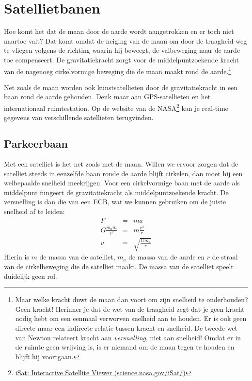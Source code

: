 \documentclass{ximera}
\begin{document}
	\author{Bart Lambregs}
    \xmsource


	\section{Satellietbanen}

	Hoe komt het dat de maan door de aarde wordt aangetrokken en er toch niet naartoe valt? Dat komt omdat de neiging van de maan om door de traagheid weg te vliegen volgens de richting waarin hij beweegt, de valbeweging naar de aarde toe compenseert. De gravitatiekracht zorgt voor de middelpuntzoekende kracht van de nagenoeg cirkelvormige beweging die de maan maakt rond de aarde.\footnote{Maar welke kracht duwt de maan dan voort om zijn snelheid te onderhouden? Geen kracht! Herinner je dat de wet van de traagheid zegt dat je geen kracht nodig hebt om een eenmaal verworven snelheid aan te houden. Er is ook geen directe maar een indirecte relatie tussen kracht en snelheid. De tweede wet van Newton relateert kracht aan \textit{versnelling}, niet aan snelheid! Omdat er in de ruimte geen wrijving is, is er niemand om de maan tegen te houden en blijft hij voortgaan.}
	
	Net zoals de maan worden ook kunstsatellieten door de gravitatiekracht in een baan rond de aarde gehouden. Denk maar aan GPS-satellieten en het internationaal ruimtestation. Op de website van de NASA\footnote{\href{http://science.nasa.gov/iSat/}{iSat: Interactive Satellite Viewer (science.nasa.gov/iSat/)}} kan je real-time gegevens van verschillende satellieten terugvinden.
	
	\subsection{Parkeerbaan}
	
	Met een satelliet is het net zoals met de maan. Willen we ervoor zorgen dat de satelliet steeds in eenzelfde baan ronde de aarde blijft cirkelen, dan moet hij een welbepaalde snelheid meekrijgen. Voor een cirkelvormige baan met de aarde als middelpunt fungeert de gravitatiekracht als middelpuntzoekende kracht. De versnelling is dan die van een ECB, wat we kunnen gebruiken om de juiste snelheid af te leiden:
	\begin{eqnarray*}
	F&=&ma\\
	G\frac{m_am}{r^2}&=&m\frac{v^2}{r}\\
	v&=&\sqrt{\frac{Gm_a}{r}}
	\end{eqnarray*}
	Hierin is $m$ de massa van de satelliet, $m_a$ de massa van de aarde en $r$ de straal van de cirkelbeweging die de satelliet maakt. De massa van de satelliet speelt duidelijk geen rol. 
	
\end{document}
